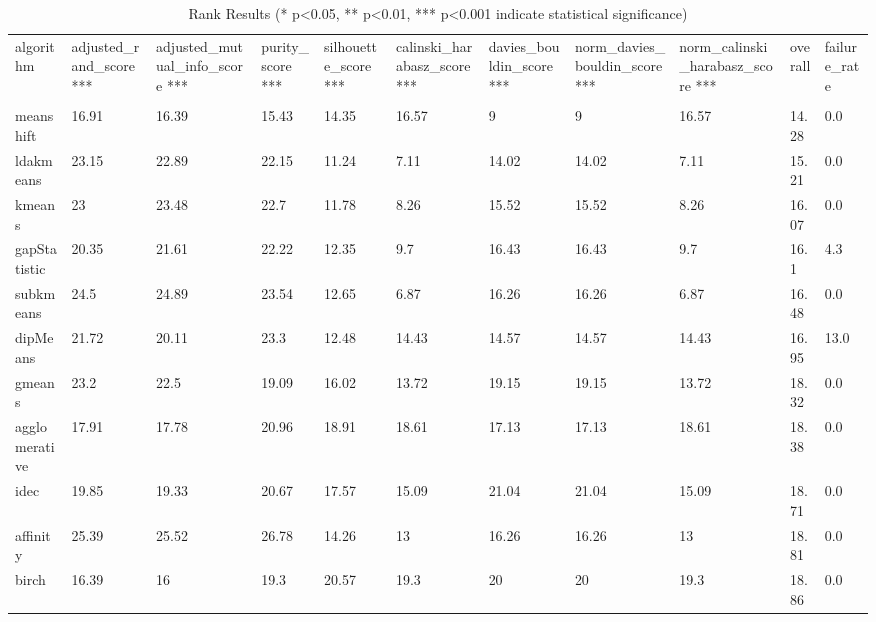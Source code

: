 \begin{table}[H]
\centering
\caption{Rank Results (* p<0.05, ** p<0.01, *** p<0.001 indicate statistical significance)}
\label{rank_results}
\begin{tabular}{|l|l|l|l|l|l|l|l|l|l|l|}
\\\hline
algorithm & adjusted\_rand\_score *** & adjusted\_mutual\_info\_score *** & purity\_score *** & silhouette\_score *** & calinski\_harabasz\_score *** & davies\_bouldin\_score *** & norm\_davies\_bouldin\_score *** & norm\_calinski\_harabasz\_score *** & overall & failure\_rate \\
\\\hline
meanshift & 16.91 & 16.39 & 15.43 & 14.35 & 16.57 & 9 & 9 & 16.57 & 14.28 & 0.0%
\\\hline
ldakmeans & 23.15 & 22.89 & 22.15 & 11.24 & 7.11 & 14.02 & 14.02 & 7.11 & 15.21 & 0.0%
\\\hline
kmeans & 23 & 23.48 & 22.7 & 11.78 & 8.26 & 15.52 & 15.52 & 8.26 & 16.07 & 0.0%
\\\hline
gapStatistic & 20.35 & 21.61 & 22.22 & 12.35 & 9.7 & 16.43 & 16.43 & 9.7 & 16.1 & 4.3%
\\\hline
subkmeans & 24.5 & 24.89 & 23.54 & 12.65 & 6.87 & 16.26 & 16.26 & 6.87 & 16.48 & 0.0%
\\\hline
dipMeans & 21.72 & 20.11 & 23.3 & 12.48 & 14.43 & 14.57 & 14.57 & 14.43 & 16.95 & 13.0%
\\\hline
gmeans & 23.2 & 22.5 & 19.09 & 16.02 & 13.72 & 19.15 & 19.15 & 13.72 & 18.32 & 0.0%
\\\hline
agglomerative & 17.91 & 17.78 & 20.96 & 18.91 & 18.61 & 17.13 & 17.13 & 18.61 & 18.38 & 0.0%
\\\hline
idec & 19.85 & 19.33 & 20.67 & 17.57 & 15.09 & 21.04 & 21.04 & 15.09 & 18.71 & 0.0%
\\\hline
affinity & 25.39 & 25.52 & 26.78 & 14.26 & 13 & 16.26 & 16.26 & 13 & 18.81 & 0.0%
\\\hline
birch & 16.39 & 16 & 19.3 & 20.57 & 19.3 & 20 & 20 & 19.3 & 18.86 & 0.0%
\\\hline

\end{tabular}
\end{table}

